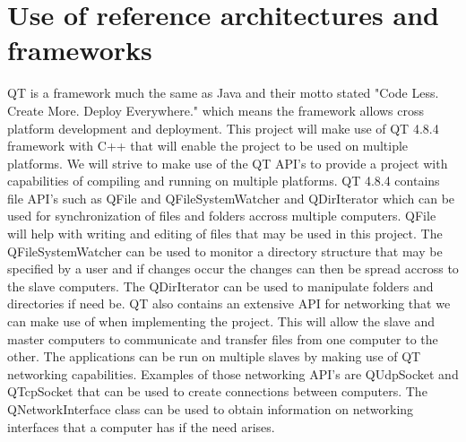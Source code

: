 \documentclass[a4paper,12pt,final]{article}
\begin{document}
\section{Use of reference architectures and\\ frameworks}
QT is a framework much the same as Java and their motto stated "Code Less. Create More. Deploy Everywhere." which means the framework allows cross platform development and deployment. This project will make use of QT 4.8.4 framework with C++ that will enable the project to be used on multiple platforms. We will strive to make use of the QT API's to provide a project with capabilities of compiling and running on multiple platforms.
\vspace{6pt}\newline
QT 4.8.4 contains file API's such as QFile and QFileSystemWatcher and QDirIterator which can be used for synchronization of files and folders accross multiple computers. QFile will help with writing and editing of files that may be used in this project. The QFileSystemWatcher can be used to monitor a directory structure that may be specified by a user and if changes occur the changes can then be spread accross to the slave computers. The QDirIterator can be used to manipulate folders and directories if need be.
\vspace{6pt}\newline
QT also contains an extensive API for networking that we can make use of when implementing the project. This will allow the slave and master computers to communicate and transfer files from one computer to the other. The applications can be run on multiple slaves by making use of QT networking capabilities. Examples of those networking API's are QUdpSocket and QTcpSocket that can be used to create connections between computers. The QNetworkInterface class can be used to obtain information on networking interfaces that a computer has if the need arises.
\end{document}
